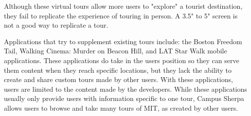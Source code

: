 \documentclass{sigchi}
\begin{document}
Although these virtual tours allow more users to "explore" a tourist destination, they fail to replicate the experience of touring in person. A 3.5" to 5" screen is not a good way to replicate a tour.

Applications that try to supplement existing tours include: the Boston Freedom Tail, Walking Cinema: Murder on Beacon Hill, and LAT Star Walk mobile applications. These applications do take in the users position so they can serve them content when they reach specific locations, but they lack the ability to create and share custom tours made by other users. With these applications, users are limited to the content made by the developers. While these applications usually only provide users with information specific to one tour, Campus Sherpa allows users to browse and take many tours of MIT, as created by other users.
\end{document}
